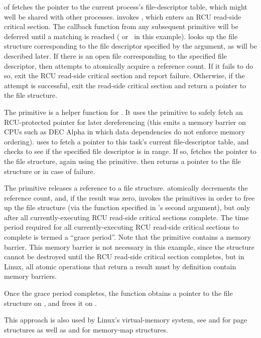 \begin{lineref}
 of  fetches the pointer to the current
process's file-descriptor table, which might well be shared
with other processes.
 invokes , which
enters an RCU read-side critical section.
The callback function from any subsequent  primitive
will be deferred until a matching  is reached
( or~ in this example).
 looks up the file structure corresponding to the file
descriptor specified by the  argument, as will be
described later.
If there is an open file corresponding to the specified file descriptor,
then  attempts to atomically acquire a reference count.
If it fails to do so,  exit the RCU read-side critical
section and report failure.
Otherwise, if the attempt is successful, 
exit the read-side
critical section and return a pointer to the file structure.

The  primitive is a helper function for
.
It uses the  primitive to safely fetch an
RCU-protected pointer for later dereferencing (this emits a
memory barrier on CPUs such as DEC Alpha in which data dependencies
do not enforce memory ordering).
 uses  to fetch a pointer to this
task's current file-descriptor table,
and  checks to see if the specified file descriptor is in range.
If so,  fetches the pointer to the file structure, again using
the  primitive.
 then returns a pointer to the file structure or 
in case of failure.

The  primitive releases a reference to a file structure.
 atomically decrements the reference count, and, if the result
was zero,  invokes the  primitives in order to
free up the file structure (via the  function
specified in 's second argument),
but only after all currently-executing
RCU read-side critical sections complete.
The time period required for all currently-executing RCU read-side
critical sections to complete is termed a ``grace period''.
Note that the  primitive contains
a memory barrier.
This memory barrier is not necessary in this example, since the structure
cannot be destroyed until the RCU read-side critical section completes,
but in Linux, all atomic operations that return a result must
by definition contain memory barriers.

Once the grace period completes, the  function
obtains a pointer to the file structure on , and frees it
on .

This approach is also used by Linux's virtual-memory system,
see  and  for
page structures as well as  and 
for memory-map structures.
\end{lineref}

